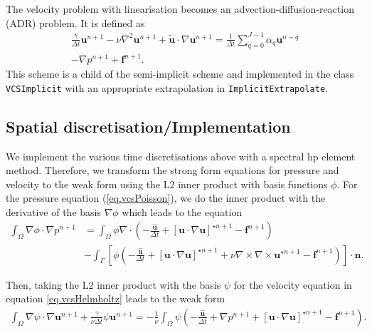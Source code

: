 The velocity problem with linearisation becomes an advection-diffusion-reaction (ADR) problem.
It is defined as
\begin{align}
    \frac{\gamma}{\Delta t} \mathbf{u}^{n+1}
    - \nu \nabla^2 \mathbf{u}^{n+1}
    + \tilde{\mathbf{u}} \cdot \nabla \mathbf{u}^{n+1}
    =
    \frac{1}{\Delta t} \sum_{q=0}^{J-1} \alpha_q \mathbf{u}^{n-q} \nonumber \\
    - \nabla p^{n+1}
    + \mathbf{f}^{n+1}
    . \label{eq.vcsADR}
\end{align}
This scheme is a child of the semi-implicit scheme and implemented in the class \verb|VCSImplicit| with an appropriate extrapolation in \verb|ImplicitExtrapolate|.


\subsection{Spatial discretisation/Implementation}
We implement the various time discretisations above with a spectral hp element method.
Therefore, we transform the strong form equations for pressure and velocity to 
the weak form using the L2 inner product with basis functions $\phi$.
For the pressure equation (\ref{eq.vcsPoisson}), we do the inner product with 
the derivative of the basis $\nabla \phi$ which leads to the equation
\begin{align}
    \int_\Omega \nabla \phi \cdot \nabla p^{n+1} &= 
    \int_\Omega \phi \nabla \cdot 
    \left( -\frac{\hat{\mathbf{u}}}{\Delta t} + 
    [\mathbf{u} \cdot \nabla \mathbf{u}]^{\star n+1} - 
    \mathbf{f}^{n+1} \right) \nonumber\\
    &- \int_{\Gamma} \left[ \phi \left( 
    -\frac{\hat{\mathbf{u}}}{\Delta t} 
    + [\mathbf{u} \cdot \nabla \mathbf{u}]^{\star n+1} 
    + \nu \nabla \times \nabla \times \mathbf{u}^{\star n+1} 
    - \mathbf{f}^{n+1} 
    \right) \right] \cdot \mathbf{n}.
    \label{eq.vcsPoissonWeak}
\end{align}

Then, taking the L2 inner product with the basis $\psi$ for the velocity equation
in equation \ref{eq.vcsHelmholtz} leads to the weak form
\begin{align}
	\int_\Omega \nabla \psi \cdot \nabla \mathbf{u}^{n+1} 
    + \frac{\gamma}{\nu \Delta t} \psi \mathbf{u}^{n+1} 
    = - \frac{1}{\nu} \int_\Omega \psi \left( 
    - \frac{\hat{\mathbf{u}}}{\Delta t} 
    + \nabla p^{n+1} 
    + [\mathbf{u} \cdot \nabla \mathbf{u}]^{\star n+1} 
    - \mathbf{f}^{n+1} 
    \right).
    \label{eq.vcsHelmholtzWeak}
\end{align}

